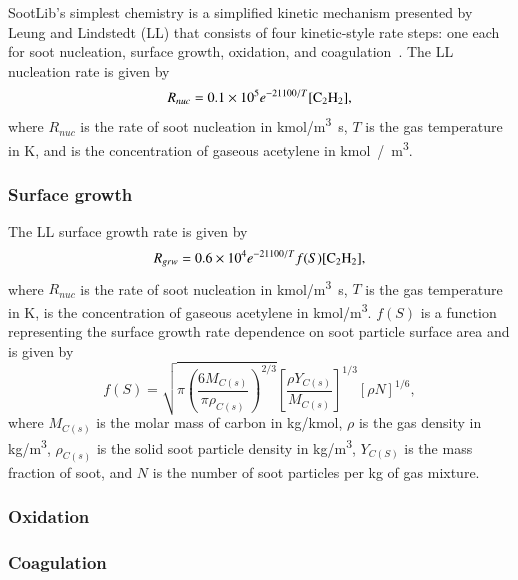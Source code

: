 \documentclass[preprint,12pt,letterpaper]{elsarticle}
\begin{document}
SootLib's simplest chemistry is a simplified kinetic mechanism presented by Leung and Lindstedt (LL) that consists of four kinetic-style rate steps: one each for soot nucleation, surface growth, oxidation, and coagulation~\cite{Leung_1991}. The LL nucleation rate is given by
\begin{equation}
    R_{nuc} = \num{0.1e5} e^{-21100/T} \ce{[C2H2]},
\end{equation}
where $R_{nuc}$ is the rate of soot nucleation in \si{kmol/m^{3} s}, $T$ is the gas temperature in \si{K}, and \ce{[C2H2]} is the concentration of gaseous acetylene in \si{kmol / m^3}.

\subsubsection{Surface growth}
\label{sss:growth}

The LL surface growth rate is given by
\begin{equation}
    R_{grw} = \num{0.6e4} e^{-21100/T} f(S) \ce{[C2H2]},
\end{equation}
where $R_{nuc}$ is the rate of soot nucleation in \si{kmol/m^{3} s}, $T$ is the gas temperature in \si{K}, \ce{[C2H2]} is the concentration of gaseous acetylene in \si{kmol/m^3}. $f(S)$ is a function representing the surface growth rate dependence on soot particle surface area and is given by
\begin{equation}
    f(S) = \sqrt{\pi \left( \frac{6M_{C(s)}}{\pi \rho_{C(s)}} \right) ^{2/3}} \left[ \frac{\rho Y_{C(s)}}{M_{C(s)}} \right]^{1/3} [\rho N]^{1/6},
\end{equation}
where $M_{C(s)}$ is the molar mass of carbon in \si{kg/kmol}, $\rho$ is the gas density in \si{kg/m^3}, $\rho_{C(s)}$ is the solid soot particle density in \si{kg/m^3}, $Y_{C(S)}$ is the mass fraction of soot, and $N$ is the number of soot particles per \si{kg} of gas mixture.

\subsubsection{Oxidation}
\label{sss:oxidation}

\subsubsection{Coagulation}
\label{sss:coagulation}
\end{document}
